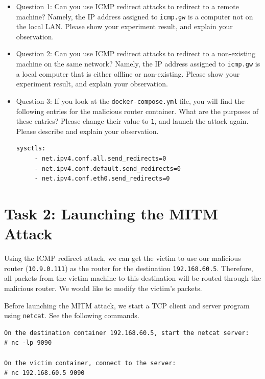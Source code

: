 \begin{itemize}
\item Question 1: Can you use ICMP redirect attacks to redirect to a remote machine? Namely,
the IP address assigned to \texttt{icmp.gw} is a computer not on the local LAN. 
Please show your experiment result, and explain your observation.  

\item Question 2: Can you use ICMP redirect attacks to redirect to a non-existing machine on
the same network? Namely, the IP address assigned to \texttt{icmp.gw} is a local computer that
is either offline or non-existing. 
Please show your experiment result, and explain your observation.  

\item Question 3: If you look at the \texttt{docker-compose.yml} file, you will find the 
following entries for the malicious router container. What are the purposes
of these entries? Please change their value to \texttt{1}, and launch the attack again. 
Please describe and explain your observation. 

\begin{lstlisting}
sysctls:
     - net.ipv4.conf.all.send_redirects=0
     - net.ipv4.conf.default.send_redirects=0
     - net.ipv4.conf.eth0.send_redirects=0
\end{lstlisting}
 
\end{itemize}





\section{Task 2: Launching the MITM Attack} 

Using the ICMP redirect attack, we can get the victim to use 
our malicious router (\texttt{10.9.0.111}) as the router for the destination
\texttt{192.168.60.5}. Therefore, all packets from the victim machine 
to this destination will be routed through the malicious router.
We would like to modify the victim's packets. 


Before launching the MITM attack, we start a TCP client and server program
using \texttt{netcat}. See the following commands.  

\begin{lstlisting}
On the destination container 192.168.60.5, start the netcat server:
# nc -lp 9090

On the victim container, connect to the server:
# nc 192.168.60.5 9090
\end{lstlisting}


